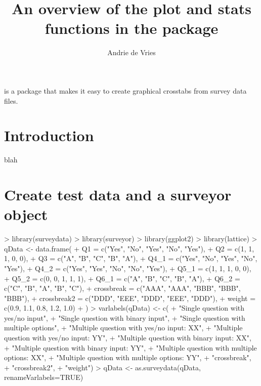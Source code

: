 \documentclass[10pt,oneside]{article}
\begin{document}
\pagestyle{empty}

\setlength{\baselineskip}{1.25em}
\setlength{\parskip}{0.5em}
\setlength{\parindent}{0.0em}



\title{An overview of the plot and stats functions in the \surveyor{} package}
\author{Andrie de Vries}
\maketitle{}

\surveyor{} is a package that makes it easy to create graphical crosstabs from survey data files.  


\section{Introduction}

blah


\section{Create test data and a surveyor object}

\begin{Schunk}
\begin{Sinput}
> library(surveydata)
> library(surveyor)
> library(ggplot2)
> library(lattice)
> qData <- data.frame(
+     Q1 = c("Yes", "No", "Yes", "No", "Yes"),
+     Q2 = c(1, 1, 1, 0, 0),
+     Q3 = c("A", "B", "C", "B", "A"),
+     Q4_1 = c("Yes", "No", "Yes", "No", "Yes"), 
+     Q4_2 = c("Yes", "Yes", "No", "No", "Yes"), 
+     Q5_1 = c(1, 1, 1, 0, 0),
+     Q5_2 = c(0, 0, 1, 1, 1),
+     Q6_1 = c("A", "B", "C", "B", "A"),
+     Q6_2 = c("C", "B", "A", "B", "C"),
+     crossbreak = c("AAA", "AAA", "BBB", "BBB", "BBB"), 
+     crossbreak2 = c("DDD", "EEE", "DDD", "EEE", "DDD"),
+     weight = c(0.9, 1.1, 0.8, 1.2, 1.0)
+ )
> varlabels(qData) <- c(
+     "Single question with yes/no input", 
+     "Single question with binary input",
+     "Single question with multiple options",
+     "Multiple question with yes/no input: XX", 
+     "Multiple question with yes/no input: YY", 
+     "Multiple question with binary input: XX",
+     "Multiple question with binary input: YY",
+     "Multiple question with multiple options: XX",
+     "Multiple question with multiple options: YY",
+     "crossbreak",
+     "crossbreak2",
+     "weight")
> qData <- as.surveydata(qData, renameVarlabels=TRUE)
\end{Sinput}
\end{Schunk}
\end{document}
